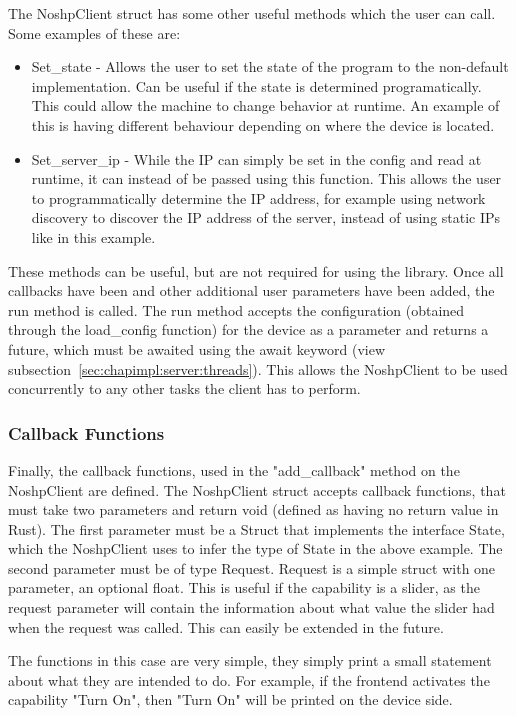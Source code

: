 The NoshpClient struct has some other useful methods which the user can call. Some examples of these are:
\begin{itemize}
    \item Set\_state - Allows the user to set the state of the program to the non-default implementation. Can be useful if the state is determined programatically. This could allow the machine to change behavior at runtime. An example of this is having different behaviour depending on where the device is located.
    \item Set\_server\_ip - While the IP can simply be set in the config and read at runtime, it can instead of be passed using this function. This allows the user to programmatically determine the IP address, for example using network discovery to discover the IP address of the server, instead of using static IPs like in this example.
\end{itemize}

These methods can be useful, but are not required for using the library. Once all callbacks have been and other additional user parameters have been added, the run method is called. The run method accepts the configuration (obtained through the load\_config function) for the device as a parameter and returns a future, which must be awaited using the await keyword (view subsection~\ref{sec:chapimpl:server:threads}). This allows the NoshpClient to be used concurrently to any other tasks the client has to perform. 

\subsubsection{Callback Functions}
Finally, the callback functions, used in the "add\_callback" method on the NoshpClient are defined. The NoshpClient struct accepts callback functions, that must take two parameters and return void (defined as having no return value in Rust). The first parameter must be a Struct that implements the interface State, which the NoshpClient uses to infer the type of State in the above example. The second parameter must be of type Request. Request is a simple struct with one parameter, an optional float. This is useful if the capability is a slider, as the request parameter will contain the information about what value the slider had when the request was called. This can easily be extended in the future. 

The functions in this case are very simple, they simply print a small statement about what they are intended to do. For example, if the frontend activates the capability "Turn On", then "Turn On" will be printed on the device side.

